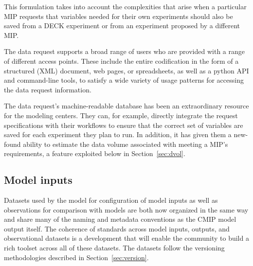 \documentclass[gmd,manuscript]{copernicus}
\newcommand{\pllabel}[1]{\label{p-#1}\linelabel{l-#1}}
\begin{document}
This formulation takes into account the complexities that arise when a
particular MIP requests that variables needed for their own
experiments should also be saved from a DECK experiment or from an
experiment proposed by a different MIP.

The data request supports a broad range of users who are 
provided with a range of different access points. These include the
entire codification in the form of a structured (XML) document, web
pages, or spreadsheets, as well as a python API and command-line tools,
to satisfy a wide variety of usage patterns for accessing 
the data request information.


The data request's machine-readable database has been an extraordinary
resource for the modeling centers. They can, for example, directly
integrate the request specifications with their workflows to ensure
that the correct set of variables are saved for each experiment they
plan to run. In addition, it has given them a new-found ability to
estimate the data volume associated with meeting a MIP's requirements,
a feature exploited below in Section~\ref{sec:dvol}.

\subsection{Model inputs}
\label{sec:data-inputs}

Datasets used by the model for configuration of model inputs
\citep[\texttt{input4MIPs}, see][]{ref:duracketal2017} as well as
observations for comparison with models \citep[\texttt{obs4MIPs},
see][]{ref:teixeiraetal2014} are both now organized in the same way
and share many of the naming and metadata conventions as the CMIP
model output itself.
\pllabel{RC3-9}
The coherence of standards across model inputs, outputs, and
observational datasets is a development that will enable the community
to build a rich toolset across all of these datasets. The datasets
follow the versioning methodologies described in Section~\ref{sec:version}.
\end{document}
